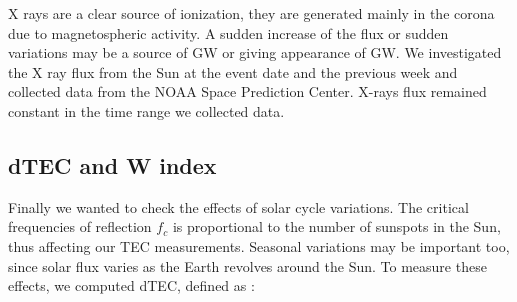 X rays are a clear source of ionization, they are generated mainly in the corona due to magnetospheric activity. A sudden increase of the flux or sudden variations may be a source of GW or giving appearance of GW. We investigated the X ray flux from the Sun at the event date and the previous week and collected data from the NOAA Space Prediction Center. %
X-rays flux remained constant in the time range we collected data.




\subsection{dTEC and W index}

Finally we wanted to check the effects of solar cycle variations. The critical frequencies of reflection $f_c$ is proportional to the number of sunspots in the Sun, thus affecting our TEC measurements. Seasonal variations may be important too, since solar flux varies as the Earth revolves around the Sun. To measure these effects, we computed dTEC, defined as \citep{Gulyaeva:2008}:

